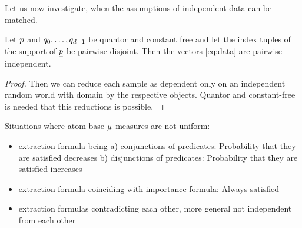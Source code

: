 Let us now investigate, when the assumptions of independent data can be matched.

\begin{lemma}
	Let $p$ and $q_{0},\ldots,q_{d-1}$ be quantor and constant free and let the index tuples of the support of $\underline{p}$ be pairwise disjoint.
	Then the vectors \eqref{eq:data} are pairwise independent.
\end{lemma}
\begin{proof}
	Then we can reduce each sample as dependent only on an independent random world with domain by the respective objects.
	Quantor and constant-free is needed that this reductions is possible.
\end{proof}



Situations where atom base $\mu$ measures are not uniform:
\begin{itemize}
	\item extraction formula being a) conjunctions of predicates: Probability that they are satisfied decreases
							b) disjunctions of predicates: Probability that they are satisfied increases
	\item extraction formula coinciding with importance formula: Always satisfied
	 \item extraction formulas contradicting each other, more general not independent from each other
\end{itemize}



%
%

